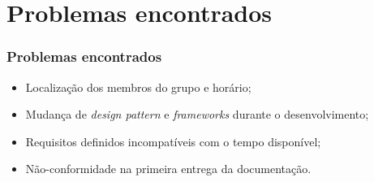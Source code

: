 \section{Problemas encontrados}

\begin{frame}
\frametitle{Problemas encontrados}
	\begin{itemize}
		\item Localização dos membros do grupo e horário;
		\item Mudança de \textit{design pattern} e \textit{frameworks} durante o desenvolvimento;
		\item Requisitos definidos incompatíveis com o tempo disponível;
		\item Não-conformidade na primeira entrega da documentação.
	\end{itemize}
\end{frame}